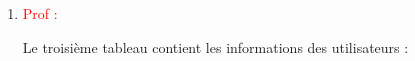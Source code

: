 \documentclass{article}
\begin{document}
\begin{enumerate}
\begin{enumerate}
\begin{enumerate}
\begin{enumerate}
	   \hspace*{-1.05in}
               \noindent{}
	  
	  
	  
	  \vspace{1cm}
	  \item \textcolor{red}{Prof :}
	  
		Le troisième tableau contient les informations des utilisateurs :	  
		
		\vspace{1cm}		
		
		\hspace*{-1.05in}
               \noindent{}		
		
		
	  

\end{enumerate}
\end{enumerate}
\end{enumerate}
\end{enumerate}
\end{document}
